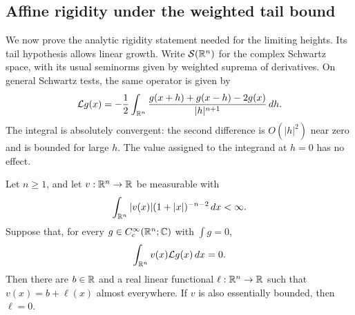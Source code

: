 \subsection{Affine rigidity under the weighted tail bound}

We now prove the analytic rigidity statement needed for the limiting
heights.  Its tail hypothesis allows linear growth.  Write
$\mathcal S(\mathbb R^n)$ for the complex Schwartz space, with its usual
seminorms given by weighted suprema of derivatives.  On general Schwartz
tests, the same operator is given by
\begin{equation}\label{eq:rigidity-fractional-operator}
 \mathcal Lg(x)
 =-\frac12\int_{\mathbb R^n}
   \frac{g(x+h)+g(x-h)-2g(x)}{|h|^{n+1}}\,dh.
\end{equation}
The integral is absolutely convergent: the second difference is
$O(|h|^2)$ near zero and is bounded for large $h$.  The value assigned to
the integrand at $h=0$ has no effect.

\begin{lemma}\label{lem:fractional-rigidity}
Let $n\ge1$, and let $v:\mathbb R^n\to\mathbb R$ be measurable with
\begin{equation}\label{eq:rigidity-weighted-tail}
 \int_{\mathbb R^n}|v(x)|(1+|x|)^{-n-2}\,dx<\infty.
\end{equation}
Suppose that, for every $g\in C_c^\infty(\mathbb R^n;\mathbb C)$ with
$\int g=0$,
\begin{equation}\label{eq:rigidity-compact-equation}
 \int_{\mathbb R^n}v(x)\mathcal Lg(x)\,dx=0.
\end{equation}
Then there are $b\in\mathbb R$ and a real linear functional
$\ell:\mathbb R^n\to\mathbb R$ such that $v(x)=b+\ell(x)$ almost everywhere.
If $v$ is also essentially bounded, then $\ell=0$.
\end{lemma}

